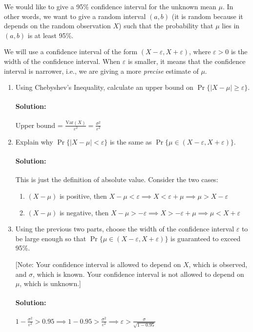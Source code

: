 \documentclass[11pt, notitlepage]{article}
\newcommand{\var}[1]{\text{Var}(#1)}
\newenvironment{solution}{\paragraph{Solution:}}{\hfill \vspace{10mm}}
\begin{document}
We would like to give a 95\% confidence interval for the unknown mean $\mu$. In other words, we want to give a random interval $(a, b)$ (it is random because it depends on the random observation $X$) such that the probability that $\mu$ lies in $(a,b)$ is at least 95\%.

We will use a confidence interval of the form $(X - \varepsilon, X + \varepsilon)$, where $\varepsilon > 0$ is the width of the confidence interval. When $\varepsilon$ is smaller, it means that the confidence interval is narrower, i.e., we are giving a more \emph{precise} estimate of $\mu$.
\begin{enumerate}[label=\alph*.)]
    \item Using Chebyshev's Inequality, calculate an upper bound on $\Pr\{|X - \mu| \ge \varepsilon\}$.
	\begin{solution}
		Upper bound = $\frac{\var{X}}{\varepsilon^2}=\frac{\sigma^2}{\varepsilon^2}$
	\end{solution}
    \item Explain why $\Pr\{|X - \mu| < \varepsilon\}$ is the same as $\Pr\{\mu \in (X - \varepsilon, X + \varepsilon)\}$.
	\begin{solution}
		This is just the definition of absolute value. Consider the two cases:
		\begin{enumerate}
		\item $(X-\mu)$ is positive, then $ X - \mu < \varepsilon \implies X < \varepsilon + \mu \implies \mu > X -\varepsilon$
		\item $(X-\mu)$ is negative, then $ X - \mu > -\varepsilon \implies X > -\varepsilon + \mu \implies \mu < X + \varepsilon$
		\end{enumerate}
	\end{solution}
    \item Using the previous two parts, choose the width of the confidence interval $\varepsilon$ to be large enough so that $\Pr\{\mu \in (X-\varepsilon, X + \varepsilon)\}$ is guaranteed to exceed 95\%.

    [Note: Your confidence interval is allowed to depend on $X$, which is observed, and $\sigma$, which is known. Your confidence interval is not allowed to depend on $\mu$, which is unknown.]
    
    \begin{solution}
    	$1- \frac{\sigma^2}{\varepsilon^2}>0.95\implies 1-0.95 > \frac{\sigma^2}{\varepsilon^2} \implies \varepsilon > \frac{\sigma}{\sqrt{1-0.95}}$
    \end{solution}
    \newpage
    

\end{enumerate}
\end{document}
